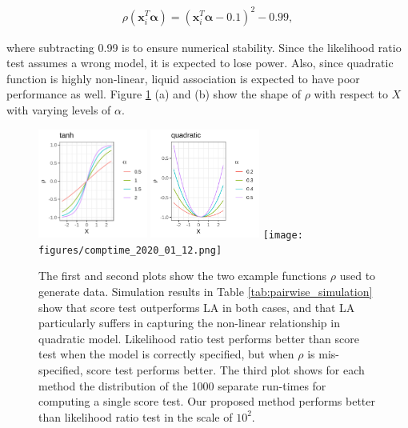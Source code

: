 \documentclass[aap,authoryear, preprint]{imsart}
\numberwithin{equation}{section}
\theoremstyle{plain}
\begin{document}
\begin{align}
    \rho(\bm{x}_i^T\bm{\alpha}) = (\bm{x}_i^T\bm{\alpha} - 0.1)^2 - 0.99,
    \label{eq:data_generating2_quadratic}
\end{align}

where subtracting 0.99 is to ensure numerical stability. Since the likelihood ratio test assumes a wrong model, it is expected to lose power. Also, since quadratic function is highly non-linear, liquid association is expected to have poor performance as well. Figure \ref{fig:sim} (a) and (b) show the shape of $\rho$ with respect to $X$ with varying levels of $\alpha$. \\
\begin{figure}
         \includegraphics[width=0.32\textwidth]{figures/tanh.png}
         \includegraphics[width=0.32\textwidth]{figures/quadratic.png}
        \texttt{[image: figures/comptime\_2020\_01\_12.png]}
        \caption{The first and second plots show the two example functions $\rho$ used to generate data. Simulation results in Table \ref{tab:pairwise_simulation} show that score test outperforms LA in both cases, and that LA particularly suffers in capturing the non-linear relationship in quadratic model. Likelihood ratio test performs better than score test when the model is correctly specified, but when $\rho$ is mis-specified, score test performs better. The third plot shows for each method the distribution of the 1000 separate run-times for computing a single score test. Our proposed method performs better than likelihood ratio test in the scale of $10^2$.}
        \label{fig:sim}
\end{figure}
\end{document}
